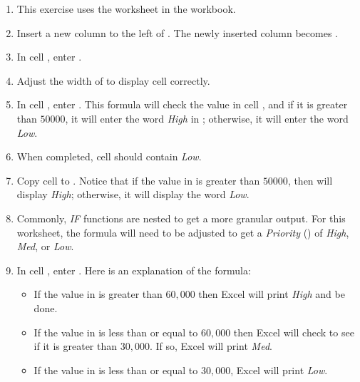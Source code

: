 \begin{enumbox}
	\begin{enumerate}
		\item This exercise uses the  worksheet in the  workbook.

		\item Insert a new column to the left of . The newly inserted column becomes .

		\item In cell , enter .

		\item Adjust the width of  to display cell  correctly.

		\item In cell , enter . This formula will check the value in cell , and if it is greater than $ 50000 $, it will enter the word \textit{High} in ; otherwise, it will enter the word \textit{Low}.

		\item When completed, cell  should contain \textit{Low}.

		\item Copy cell  to . Notice that if the value in  is greater than $ 50000 $, then  will display \textit{High}; otherwise, it will display the word \textit{Low}.

		\item Commonly, \textit{IF} functions are nested to get a more granular output. For this worksheet, the formula will need to be adjusted to get a \textit{Priority} () of \textit{High}, \textit{Med}, or \textit{Low}.

		\item In cell , enter . Here is an explanation of the formula:
		
		\begin{itemize}
			\item If the value in  is greater than $ 60,000 $ then Excel will print \textit{High} and be done.
			\item If the value in  is less than or equal to $ 60,000 $ then Excel will check to see if it is greater than $ 30,000 $. If so, Excel will print \textit{Med}.
			\item If the value in  is less than or equal to $ 30,000 $, Excel will print \textit{Low}.
		\end{itemize}
	

\end{enumerate}
\end{enumbox}
